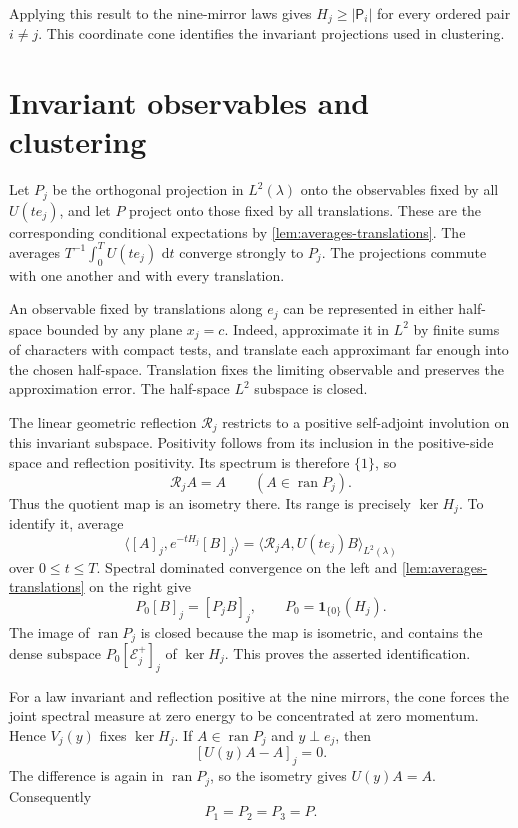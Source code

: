 \documentclass[11pt,letterpaper,reqno]{amsart}
\newcommand{\dd}{\,\mathrm d}
\begin{document}
Applying this result to the nine-mirror laws gives
$H_j\ge|\mathsf P_i|$ for every ordered pair $i\ne j$. This coordinate
cone identifies the invariant projections used in clustering.

\section{Invariant observables and clustering}
\label{subsec:invariant-reflection}

Let $P_j$ be the orthogonal projection in $L^2(\lambda)$ onto the
observables fixed by all $U(te_j)$, and let $P$ project onto those
fixed by all translations. These are the corresponding conditional
expectations by \cref{lem:averages-translations}. The averages
$T^{-1}\int_0^TU(te_j)\,\dd t$ converge strongly to $P_j$.
The projections commute with one another and with every translation.

An observable fixed by translations along $e_j$ can be represented
in either half-space bounded by any plane $x_j=c$. Indeed, approximate
it in $L^2$ by finite sums of characters with compact tests, and translate
each approximant far enough into the chosen half-space. Translation
fixes the limiting observable and preserves the approximation error.
The half-space $L^2$ subspace is closed.

The linear geometric reflection $\mathcal R_j$ restricts to a positive
self-adjoint involution on this invariant subspace. Positivity follows
from its inclusion in the positive-side space and reflection
positivity. Its spectrum is therefore $\{1\}$, so
\begin{equation}\label{eq:invariant-reflection-fixed}
 \mathcal R_jA=A\qquad(A\in\operatorname{ran}P_j).
\end{equation}
Thus the quotient map is an isometry there. Its range is precisely
$\ker H_j$. To identify it, average
\[
 \langle[A]_j,e^{-tH_j}[B]_j\rangle
     =\langle\mathcal R_jA,U(te_j)B\rangle_{L^2(\lambda)}
\]
over $0\le t\le T$. Spectral dominated convergence on the left and
\cref{lem:averages-translations} on the right give
\begin{equation}\label{eq:zero-energy-class}
 P_0[B]_j=[P_jB]_j,\qquad P_0=\mathbf1_{\{0\}}(H_j).
\end{equation}
The image of $\operatorname{ran}P_j$ is closed because the map is
isometric, and contains the dense subspace $P_0[\mathcal E_j^+]_j$
of $\ker H_j$. This proves the asserted identification.

For a law invariant and reflection positive at the nine mirrors,
the cone forces the joint spectral measure at zero energy to be
concentrated at zero momentum. Hence $V_j(y)$ fixes $\ker H_j$.
If $A\in\operatorname{ran}P_j$ and $y\perp e_j$, then
\[
 [U(y)A-A]_j=0.
\]
The difference is again in $\operatorname{ran}P_j$, so the isometry
gives $U(y)A=A$. Consequently
\begin{equation}\label{eq:invariant-projections-equal}
 P_1=P_2=P_3=P.
\end{equation}
\end{document}
